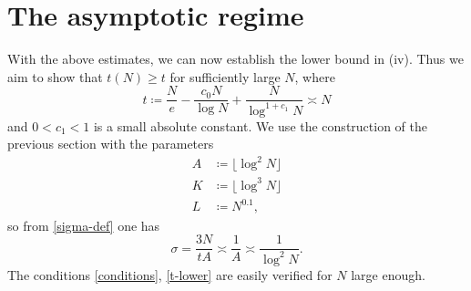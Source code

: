\documentclass[12pt,a4paper,reqno]{amsart}
\numberwithin{equation}{section}
\theoremstyle{plain}
\theoremstyle{definition}
\begin{document}
\section{The asymptotic regime}

With the above estimates, we can now establish the lower bound in (iv).  Thus we aim to show that $t(N) \geq t$ for sufficiently large $N$, where
\begin{equation}\label{main-lower}
   t \coloneqq \frac{N}{e} - \frac{c_0 N}{\log N} + \frac{N}{\log^{1+c_1} N} \asymp N
\end{equation}
and $0 < c_1 < 1$ is a small absolute constant. We use the construction of the previous section with the parameters
\begin{align}
  A &\coloneqq \lfloor \log^2 N \rfloor\label{a-asym}\\
K &\coloneqq \lfloor \log^3 N \rfloor \label{k-asym} \\
L &\coloneqq N^{0.1},\label{l-asym}
\end{align}
so from \eqref{sigma-def} one has
\begin{equation}\label{sigma-alt}
   \sigma = \frac{3N}{tA} \asymp \frac{1}{A} \asymp \frac{1}{\log^2 N}.
\end{equation}
The conditions \eqref{conditions}, \eqref{t-lower} are easily verified for $N$ large enough.
\end{document}
